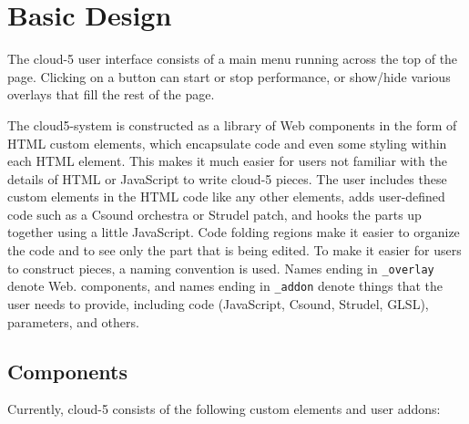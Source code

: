 \documentclass[runningheads,a4paper]{llncs}
\begin{document}
\section{Basic Design}

The cloud-5 user interface consists of a main menu running across the top of the page. Clicking on a button can start or stop performance, or show/hide various overlays that fill the rest of the page. 

The cloud5-system is constructed as a library of Web components in the form of HTML custom elements, which encapsulate code and even some styling within each HTML element. This makes it much easier for users not familiar with the details of HTML or JavaScript to write cloud-5 pieces. The user includes these custom elements in the HTML code like any other elements, adds user-defined code such as a Csound orchestra or Strudel patch, and hooks the parts up together using a little JavaScript. Code folding regions make it easier to organize the code and to see only the part that is being edited. To make it easier for users to construct pieces, a naming convention is used. Names ending in \texttt{\_overlay} denote Web. components, and names ending in \texttt{\_addon} denote things that the user needs to provide, including code (JavaScript, Csound, Strudel, GLSL), parameters, and others.

\subsection{Components}

Currently, cloud-5 consists of the following custom elements and user addons:
\end{document}
